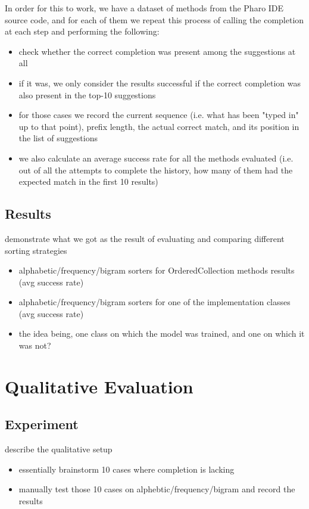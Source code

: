 In order for this to work, we have a dataset of methods from the Pharo IDE source code, and for each of them we repeat this process of calling the completion at each step and performing the following:
\begin{itemize}
    \item check whether the correct completion was present among the suggestions at all
    \item if it was, we only consider the results successful if the correct completion was also present in the top-10 suggestions
    \item for those cases we record the current sequence (i.e. what has been "typed in" up to that point), prefix length, the actual correct match, and its position in the list of suggestions
    \item we also calculate an average success rate for all the methods evaluated (i.e. out of all the attempts to complete the history, how many of them had the expected match in the first 10 results)
\end{itemize}

\subsection{Results}
demonstrate what we got as the result of evaluating and comparing different sorting strategies
\begin{itemize}
    \item alphabetic/frequency/bigram sorters for OrderedCollection methods results (avg success rate)
    \item alphabetic/frequency/bigram sorters for one of the implementation classes (avg success rate)
    \item the idea being, one class on which the model was trained, and one on which it was not?
\end{itemize}

\section{Qualitative Evaluation}
\label{sec:Evaluation-Qualitative}
\subsection{Experiment}
describe the qualitative setup
\begin{itemize}
    \item essentially brainstorm 10 cases where completion is lacking
    \item manually test those 10 cases on alphebtic/frequency/bigram and record the results
\end{itemize}
